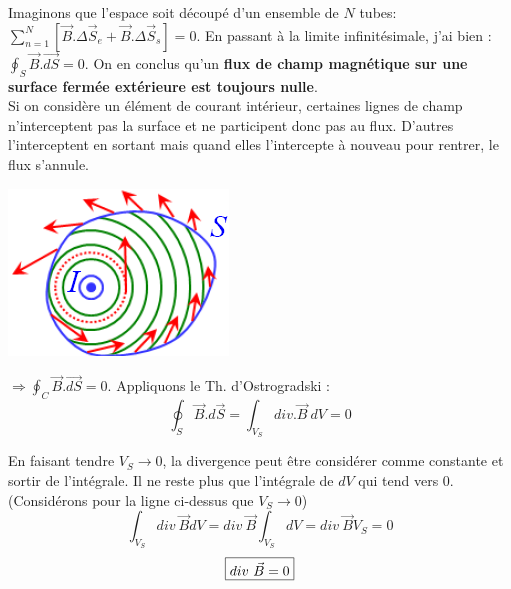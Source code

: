 \documentclass	[11pt, a4paper, openany]{book}
\begin{document}
Imaginons que l'espace soit découpé d'un ensemble de $N$ tubes: $\sum_{n=1}^N [\vec{B}.\Delta\vec{S}_e + \vec{B}.\Delta\vec{S}_s] = 0$. En passant à la limite infinitésimale, j'ai bien : $\oint_S \vec{B}.\vec{dS} = 0$. On en conclus qu'un \textbf{flux de champ magnétique sur une surface fermée extérieure est toujours nulle}.\\

Si on considère un élément de courant intérieur, certaines lignes de champ n'interceptent pas la surface et ne participent donc pas au flux. D'autres l'interceptent en sortant mais quand elles l'intercepte à nouveau pour rentrer, le flux s'annule.
\begin{center}
\includegraphics[scale=0.60]{magneto/image21.png}\\
\end{center}
$\Rightarrow \oint_C \vec{B}.\vec{dS} = 0$. Appliquons le Th. d'Ostrogradski :
\begin{equation}
\oint_S \vec{B}.d\vec{S} = \int_{V_S} div.\vec{B}\ dV = 0
\end{equation}

En faisant tendre $V_S \rightarrow 0$, la divergence peut être considérer comme constante et sortir de l'intégrale. Il ne reste plus que l'intégrale de $dV$ qui tend vers 0. (Considérons pour la ligne ci-dessus que $V_S \rightarrow 0$)
\begin{equation}
\int_{V_S} div\ \vec{B}dV = div\ \vec{B}\int_{V_S} dV = div\ \vec{B} V_S = 0
\end{equation}
\begin{equation}
\fbox{$div\ \vec{B} = 0 $}
\end{equation}
\\
\end{document}
